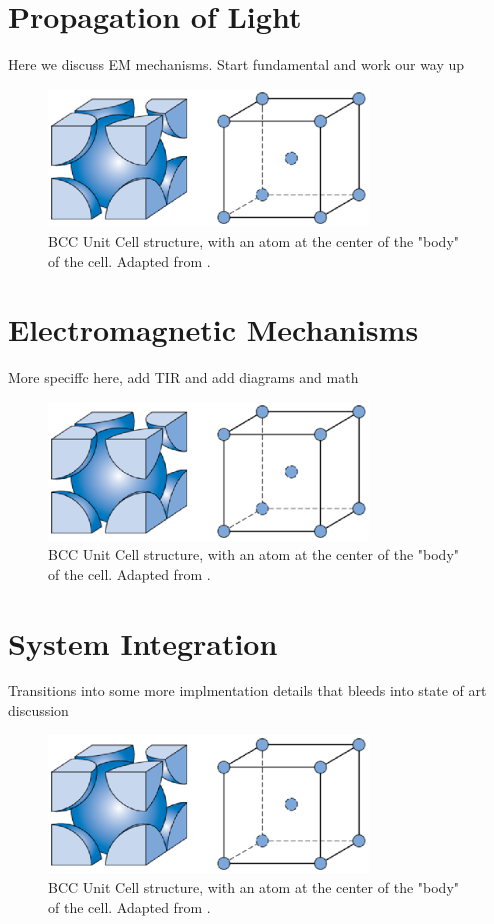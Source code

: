\documentclass[10pt]{article}
\begin{document}
\section{Propagation of Light}

Here we discuss EM mechanisms. Start fundamental and work our way up 


\begin{figure}[h]
    \centering
    \includegraphics[width=8.5cm]{fig1.eps}
    \caption{\label{tab1}BCC Unit Cell structure, with an atom at the center of the "body" of the cell. Adapted from \cite{ref01}.} 
    \end{figure}

\section{Electromagnetic Mechanisms}

More speciffc here, add TIR and add diagrams and math

\begin{figure}[h]
    \centering
    \includegraphics[width=8.5cm]{fig1.eps}
    \caption{\label{tab1}BCC Unit Cell structure, with an atom at the center of the "body" of the cell. Adapted from \cite{ref01}.} 
    \end{figure}

\section{System Integration}

Transitions into some more implmentation details that bleeds into state of art discussion 


\begin{figure}[h]
    \centering
    \includegraphics[width=8.5cm]{fig1.eps}
    \caption{\label{tab1}BCC Unit Cell structure, with an atom at the center of the "body" of the cell. Adapted from \cite{ref01}.} 
    \end{figure}
\end{document}

